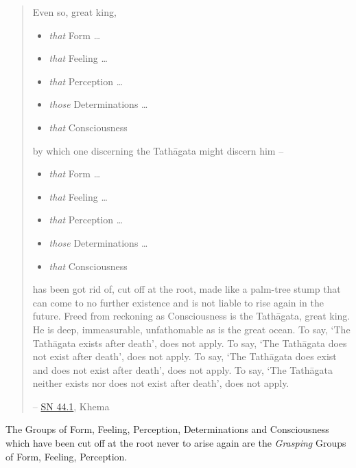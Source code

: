 \begin{quote}
Even so, great king,

\begin{itemize}
\item
  \emph{that} Form \ldots\hspace{0pt}
\item
  \emph{that} Feeling \ldots\hspace{0pt}
\item
  \emph{that} Perception \ldots\hspace{0pt}
\item
  \emph{those} Determinations \ldots\hspace{0pt}
\item
  \emph{that} Consciousness
\end{itemize}

by which one discerning the Tathāgata might discern him -- 

\begin{itemize}
\item
  \emph{that} Form \ldots\hspace{0pt}
\item
  \emph{that} Feeling \ldots\hspace{0pt}
\item
  \emph{that} Perception \ldots\hspace{0pt}
\item
  \emph{those} Determinations \ldots\hspace{0pt}
\item
  \emph{that} Consciousness
\end{itemize}

has been got rid of, cut off at the root, made like a palm-tree stump that can come to no further existence and is not liable to rise again in the future. Freed from reckoning as Consciousness is the Tathāgata, great king. He is deep, immeasurable, unfathomable as is the great ocean. To say, `The Tathāgata exists after death', does not apply. To say, `The Tathāgata does not exist after death', does not apply. To say, `The Tathāgata does exist and does not exist after death', does not apply. To say, `The Tathāgata neither exists nor does not exist after death', does not apply.

 -- \href{https://suttacentral.net/sn44.1/en/bodhi}{SN 44.1}, Khema
\end{quote}

The Groups of Form, Feeling, Perception, Determinations and Consciousness which have been cut off at the root never to arise again are the \emph{Grasping} Groups of Form, Feeling, Perception.


